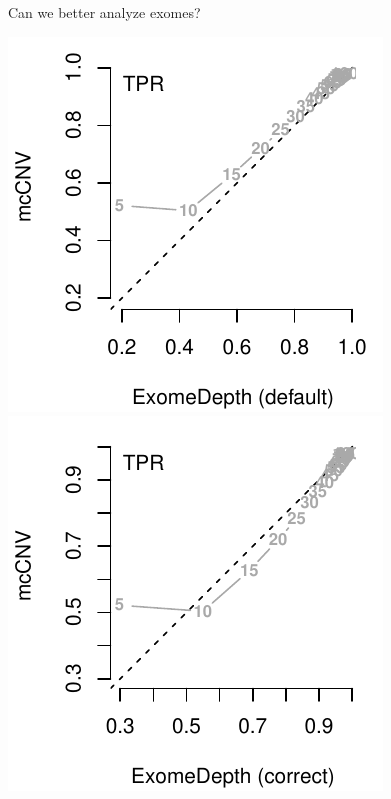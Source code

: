 \documentclass[
  10pt,
  ignorenonframetext,
  m]{beamer}
\begin{document}
\begin{frame}{Can we better analyze exomes?}
\protect\hypertarget{can-we-better-analyze-exomes-2}{}

\begin{center}\includegraphics[width=0.49\linewidth]{defense_files/figure-beamer/simResTPR-1} \includegraphics[width=0.49\linewidth]{defense_files/figure-beamer/simResTPR-2} \end{center}

\end{frame}
\end{document}
